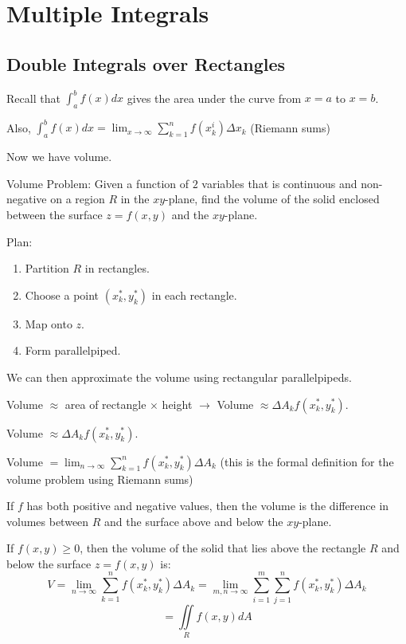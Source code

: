 \documentclass[../calc3.tex]{subfiles}
\begin{document}
\chapter{Multiple Integrals}
\section{Double Integrals over Rectangles}
Recall that $\int_a^b f(x)dx$ gives the area under the curve from $x=a$ to $x=b$.

Also, $\int_a^b f(x)dx=\lim_{x\to\infty}\sum_{k=1}^n f(x_k^i)\Delta x_k$ (Riemann sums)

Now we have volume.

Volume Problem: Given a function of $2$ variables that is continuous and non-negative on a region $R$ in the $xy$-plane, find the volume of the solid enclosed between the surface $z=f(x,y)$ and the $xy$-plane.

Plan:
\begin{enumerate}
    \item Partition $R$ in rectangles.
    \item Choose a point $(x_k^*, y_k^*)$ in each rectangle.
    \item Map onto $z$.
    \item Form parallelpiped.
\end{enumerate}

We can then approximate the volume using rectangular parallelpipeds.

Volume $\approx$ area of rectangle $\times$ height $\rightarrow$ Volume $\approx \Delta A_k f(x_k^*, y_k^*)$.

Volume $\approx \Delta A_k f(x_k^*, y_k^*)$.

Volume $=\lim_{n\to\infty}\sum_{k=1}^n f(x_k^*, y_k^*)\Delta A_k$ (this is the formal definition for the volume problem using Riemann sums)

If $f$ has both positive and negative values, then the volume is the difference in volumes between $R$ and the surface above and below the $xy$-plane.

\begin{definition}
    If $f(x,y)\geq 0$, then the volume of the solid that lies above the rectangle $R$ and below the surface $z=f(x,y)$ is:
    \[ V = \lim_{n\to\infty}\sum_{k=1}^{n}f(x_k^*, y_k^*)\Delta A_k = \lim_{m,n\to \infty}\sum_{i=1}^m\sum_{j=1}^nf(x_k^*,y_k^*)\Delta A_k \]
    \[ = \iint\limits_{R} f(x,y)dA \]
\end{definition}
\end{document}
